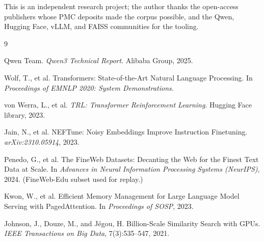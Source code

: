 \documentclass[11pt]{article}
\begin{document}
This is an independent research project; the author thanks the open-access
publishers whose PMC deposits made the corpus possible, and the Qwen,
Hugging Face, vLLM, and FAISS communities for the tooling.

\begin{thebibliography}{9}

Qwen Team.
\newblock \emph{Qwen3 Technical Report}.
\newblock Alibaba Group, 2025.

Wolf, T., et al.
\newblock Transformers: State-of-the-Art Natural Language Processing.
\newblock In \emph{Proceedings of EMNLP 2020: System Demonstrations}.

von Werra, L., et al.
\newblock \emph{TRL: Transformer Reinforcement Learning}.
\newblock Hugging Face library, 2023.

Jain, N., et al.
\newblock NEFTune: Noisy Embeddings Improve Instruction Finetuning.
\newblock \emph{arXiv:2310.05914}, 2023.

Penedo, G., et al.
\newblock The FineWeb Datasets: Decanting the Web for the Finest Text Data
at Scale.
\newblock In \emph{Advances in Neural Information Processing Systems
(NeurIPS)}, 2024.
\newblock (FineWeb-Edu subset used for replay.)

Kwon, W., et al.
\newblock Efficient Memory Management for Large Language Model Serving
with PagedAttention.
\newblock In \emph{Proceedings of SOSP}, 2023.

Johnson, J., Douze, M., and J\'egou, H.
\newblock Billion-Scale Similarity Search with GPUs.
\newblock \emph{IEEE Transactions on Big Data}, 7(3):535--547, 2021.

\end{thebibliography}
\end{document}
